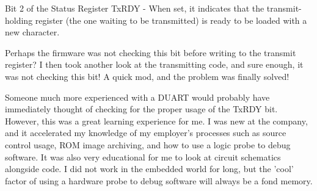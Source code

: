 Bit 2 of the Status Register
TxRDY - When set, it indicates that the transmit-holding register (the one waiting to be transmitted) is ready to be loaded with a new character.

Perhaps the firmware was not checking this bit before writing to the transmit register? I then took another look at the transmitting code, and sure enough, it was not checking this bit! A quick mod, and the problem was finally solved!

Someone much more experienced with a DUART would probably have immediately thought of checking for the proper usage of the TxRDY bit. However, this was a great learning experience for me. I was new at the company, and it accelerated my knowledge of my employer's processes such as source control usage, ROM image archiving, and how to use a logic probe to debug software. It was also very educational for me to look at circuit schematics alongside code. I did not work in the embedded world for long, but the 'cool' factor of using a hardware probe to debug software will always be a fond memory.